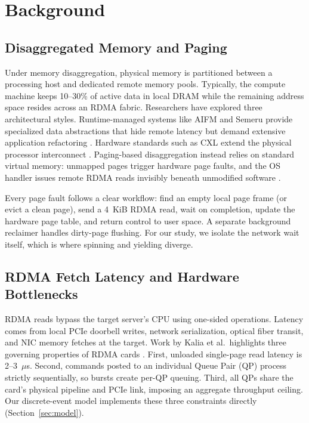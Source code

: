 \section{Background}
\label{sec:background}

\subsection{Disaggregated Memory and Paging}
Under memory disaggregation, physical memory is partitioned between a processing host and dedicated remote memory pools. Typically, the compute machine keeps 10--30\% of active data in local DRAM while the remaining address space resides across an RDMA fabric. Researchers have explored three architectural styles. Runtime-managed systems like AIFM and Semeru provide specialized data abstractions that hide remote latency but demand extensive application refactoring \cite{aifm,semeru}. Hardware standards such as CXL extend the physical processor interconnect \cite{cxl}. Paging-based disaggregation instead relies on standard virtual memory: unmapped pages trigger hardware page faults, and the OS handler issues remote RDMA reads invisibly beneath unmodified software \cite{infiniswap,fastswap,leap,hermit,dilos}.

Every page fault follows a clear workflow: find an empty local page frame (or evict a clean page), send a 4~KiB RDMA read, wait on completion, update the hardware page table, and return control to user space. A separate background reclaimer handles dirty-page flushing. For our study, we isolate the network wait itself, which is where spinning and yielding diverge.

\subsection{RDMA Fetch Latency and Hardware Bottlenecks}
RDMA reads bypass the target server's CPU using one-sided operations. Latency comes from local PCIe doorbell writes, network serialization, optical fiber transit, and NIC memory fetches at the target. Work by Kalia et al.\ highlights three governing properties of RDMA cards \cite{kalia}. First, unloaded single-page read latency is 2--3~$\mu$s. Second, commands posted to an individual Queue Pair (QP) process strictly sequentially, so bursts create per-QP queuing. Third, all QPs share the card's physical pipeline and PCIe link, imposing an aggregate throughput ceiling. Our discrete-event model implements these three constraints directly (Section~\ref{sec:model}).

